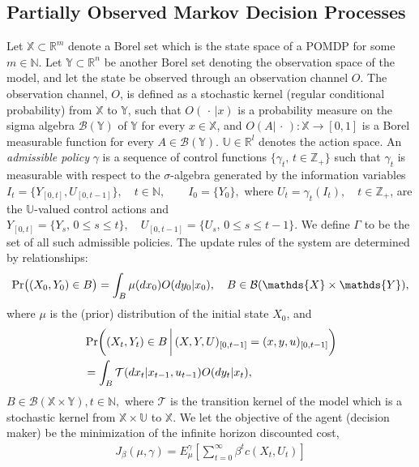 \documentclass[letterpaper, 10 pt, conference]{ieeeconf}  %
\def\Pr{\mathop{\rm Pr}}
\theoremstyle{definition}
\theoremstyle{remark}
\newcommand{\Zplus}{\mathds{Z}_+}
\begin{document}
\subsection{Partially Observed Markov Decision Processes}
Let $\mathds{X} \subset \mathds{R}^m$ denote a Borel set which is the state space of a POMDP for some $m\in\mathds{N}$. Let
$\mathds{Y} \subset \mathds{R}^n$ be another Borel set denoting the observation space of the model, and let the state be observed through an
observation channel $O$. The observation channel, $O$, is defined as a stochastic kernel (regular
conditional probability) from  $\mathds{X}$ to $\mathds{Y}$, such that
$O(\,\cdot\,|x)$ is a probability measure on the sigma algebra $\mathcal{B}(\mathds{Y})$ of $\mathds{Y}$ for every $x
\in \mathds{X}$, and $O(A|\,\cdot\,): \mathds{X}\to [0,1]$ is a Borel
measurable function for every $A \in \mathcal{B}(\mathds{Y})$.
$\mathds{U}\in \mathds{R}^l$ denotes the action space. An {\em admissible policy} $\gamma$ is a
sequence of control functions $\{\gamma_t,\, t\in \Zplus\}$ such
that $\gamma_t$ is measurable with respect to the $\sigma$-algebra
generated by the information variables
$
I_t=\{Y_{[0,t]},U_{[0,t-1]}\}, \quad t \in \mathds{N}, \quad
  \quad I_0=\{Y_0\},
$
where $U_t=\gamma_t(I_t),\quad t\in \Zplus$,
are the $\mathds{U}$-valued control
actions and 
$Y_{[0,t]} = \{Y_s,\, 0 \leq s \leq t \}, \quad U_{[0,t-1]} =
  \{U_s, \, 0 \leq s \leq t-1 \}.$ We define $\Gamma$ to be the set of all such admissible policies. The update rules of the system are determined by
relationships:
\[  \Pr\bigl( (X_0,Y_0)\in B \bigr) =  \int_B \mu(dx_0)O(dy_0|x_0), \quad B\in \mathcal{B}(\mathds{X}\times\mathds{Y}), \]
where $\mu$ is the (prior) distribution of the initial state $X_0$, and
\begin{eqnarray*}
\label{eq_evol}
 &\Pr\biggl( (X_t,Y_t)\in B \, \bigg|\, (X,Y,U)_{[0,t-1]}=(x,y,u)_{[0,t-1]} \biggr)\\
& = \int_B \mathcal{T}(dx_t|x_{t-1}, u_{t-1})O(dy_t|x_t),  
\end{eqnarray*}
$B\in \mathcal{B}(\mathds{X}\times\mathds{Y}), t\in \mathds{N},$ where $\mathcal{T}$ is the transition kernel of the model which is a stochastic kernel from $\mathds{X}\times
\mathds{U}$ to $\mathds{X}$.  We let the objective of the agent (decision maker) be the minimization of the infinite horizon discounted cost, 
  \begin{align}\label{criterion1}
    J_{\beta}(\mu,\gamma)= E_\mu^{\gamma}\left[\sum_{t=0}^{\infty} \beta^t c(X_t,U_t)\right]
  \end{align}
\end{document}
